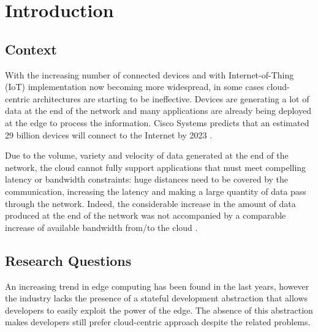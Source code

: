 \chapter{Introduction}

\section{Context}


With the increasing number of connected devices and with Internet-of-Thing (IoT) implementation now becoming more widespread, in some cases cloud-centric architectures are starting to be ineffective. Devices are generating a lot of data at the end of the network and many applications are already being deployed at the edge to process the information.
Cisco Systems predicts that an estimated 29 billion devices will connect to the Internet by 2023 \cite{cisco2018-2023}.

Due to the volume, variety and velocity of data generated at the end of the network, the cloud cannot fully support applications that must meet compelling latency or bandwidth constraints: huge distances need to be covered by the communication, increasing the latency and making a large quantity of data pass through the network.
Indeed, the considerable increase in the amount of data produced at the end of the network was not accompanied by a comparable increase of available bandwidth from/to the cloud \cite{promise-of-edge-computing}.



\section{Research Questions}
An increasing trend in edge computing has been found in the last years, however the industry lacks the presence of a stateful development abstraction that allows developers to easily exploit the power of the edge. The absence of this abstraction makes developers still prefer cloud-centric approach despite the related problems.

